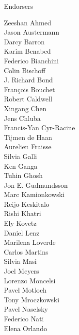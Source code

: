 \documentclass[PICOReport.tex]{subfiles}
\begin{document}
\Large { \centerline {Endorsers}}

\footnotesize {

\begin{multicols}{4}
Zeeshan Ahmed                   \\
Jason Austermann                \\
Darcy Barron                    \\
Karim Benabed                   \\
Federico Bianchini              \\
Colin Bischoff                  \\
J. Richard Bond                 \\
Fran\c{c}ois Bouchet            \\
Robert Caldwell                 \\
Xingang Chen                    \\
Jens Chluba                     \\
Francis-Yan Cyr-Racine          \\
Tijmen de Haan                  \\
Aurelien Fraisse                \\
Silvia Galli                    \\
Ken Ganga                       \\
Tuhin Ghosh                     \\
Jon E. Gudmundsson              \\
Marc Kamionkowski               \\
Reijo Keskitalo                 \\
Rishi Khatri                    \\
Ely Kovetz                      \\
Daniel Lenz                     \\
Marilena Loverde                \\
Carlos Martins                  \\
Silvia Masi                     \\
Joel Meyers                     \\
Lorenzo Moncelsi                \\
Pavel Motloch                   \\
Tony Mroczkowski                \\
Pavel Naselsky                  \\
Federico Nati                   \\
Elena Orlando                   \\

\end{multicols}}
\end{document}
